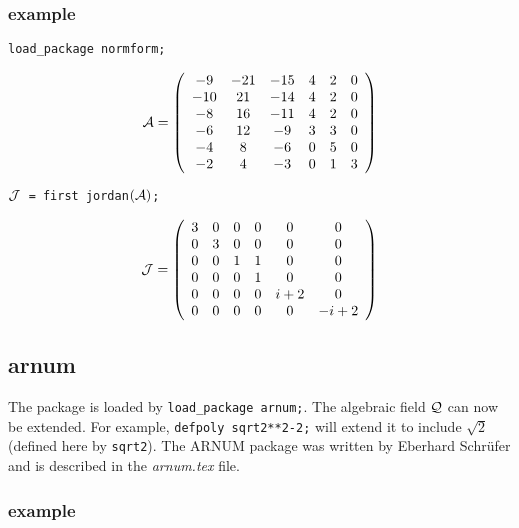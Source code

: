 \subsubsection{example}

{\tt load\_package normform;}

\begin{displaymath}
{\cal A} = \left( \begin{array}{cccccc} -9 & -21 & -15 & 4 & 2 & 0 \\
-10 & 21 & -14 & 4 & 2 & 0 \\ -8 & 16 & -11 & 4 & 2 & 0 \\ -6 & 12 & -9 
& 3 & 3 & 0 \\ -4 & 8 & -6 & 0 & 5 & 0 \\ -2 & 4 & -3 & 0 & 1 & 3 
\end{array} \right)
\end{displaymath}

\begin{flushleft}
{\tt ${\cal J}$ = first jordan$({\cal A})$;}
\end{flushleft}
  
\begin{displaymath}
{\cal J} = \left( \begin{array}{cccccc} 3 & 0 & 0 & 0 & 0 & 0 \\ 0 & 3 
& 0 & 0 & 0 & 0 \\ 0 & 0 & 1 & 1 & 0 & 0 \\ 0 & 0 & 0 & 1 & 0 & 0 \\
 0 & 0 & 0 & 0 & i+2 & 0 \\ 0 & 0 & 0 & 0 & 0 & -i+2 
\end{array} \right)
\end{displaymath}

\newpage


\subsection{arnum}

The package is loaded by {\tt load\_package arnum;}. The algebraic 
field ${\cal Q}$ can now be extended. For example, {\tt defpoly 
sqrt2**2-2;} will extend it to include ${\sqrt{2}}$ (defined here by 
{\tt sqrt2}). The {\small ARNUM} package was written by Eberhard 
Schr\"ufer and is described in the {\it arnum.tex} file.

\subsubsection{example}

